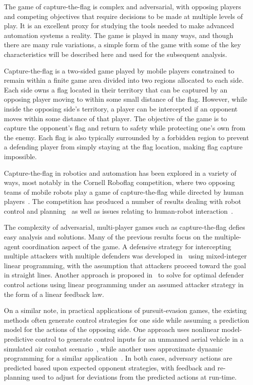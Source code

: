 \documentclass[letterpaper, 10 pt, conference]{ieeeconf}  %
\numberwithin{algorithm}{section}
\begin{document}
The game of capture-the-flag is complex and adversarial, with opposing players and competing objectives that require decisions to be made at multiple levels of play.  It is an excellent proxy for studying the tools needed to make advanced automation systems a reality.  The game is played in many ways, and though there are many rule variations, a simple form of the game with some of the key characteristics will be described here and used for the subsequent analysis.  

Capture-the-flag is a two-sided game played by mobile players constrained to remain within a finite game area divided into two regions allocated to each side.  Each side owns a flag located in their territory that can be captured by an opposing player moving to within some small distance of the flag.  However, while inside the opposing side's territory, a player can be intercepted if an opponent moves within some distance of that player.  The objective of the game is to capture the opponent's flag and return to safety while protecting one's own from the enemy.  Each flag is also typically surrounded by a forbidden region to prevent a defending player from simply staying at the flag location, making flag capture impossible.  

Capture-the-flag in robotics and automation has been explored in a variety of ways, most notably in the Cornell Roboflag competition, where two opposing teams of mobile robots play a game of capture-the-flag while directed by human players~\cite{DAndrea:2003p95}. The competition has produced a number of results dealing with robot control and planning~\cite{Earl:2007p101, Campbell:2003p5, Waydo:2003p97} as well as issues relating to human-robot interaction~\cite{Parasuraman:2005p99}.  

The complexity of adversarial, multi-player games such as capture-the-flag defies easy analysis and solutions.  Many of the previous results focus on the multiple-agent coordination aspect of the game.  A defensive strategy for intercepting multiple attackers with multiple defenders was developed in~\cite{Earl:2007p101} using mixed-integer linear programming, with the assumption that attackers proceed toward the goal in straight lines.  Another approach is proposed in~\cite{Chasparis:2005p102} to solve for optimal defender control actions using linear programming under an assumed attacker strategy in the form of a linear feedback law.  

On a similar note, in practical applications of pursuit-evasion games, the existing methods often generate control strategies for one side while assuming a prediction model for the actions of the opposing side.  One approach uses nonlinear model-predictive control to generate control inputs for an unmanned aerial vehicle in a simulated air combat scenario~\cite{Sprinkle:2004p100}, while another uses approximate dynamic programming for a similar application~\cite{McGrew:2008p103}.  In both cases, adversary actions are predicted based upon expected opponent strategies, with feedback and re-planning used to adjust for deviations from the predicted actions at run-time.  
\end{document}
